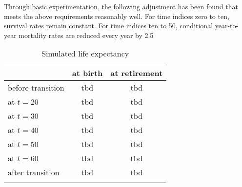 Through basic experimentation, the following adjustment has been found that meets the above requirements reasonably well. For time indices zero to ten, survival rates remain constant. For time indices ten to 50, conditional year-to-year mortality rates are reduced every year by 2.5%

\begin{table}[ht]
    \caption{Simulated life expectancy}
    \label{tab:life_expectancy}
    \centering
    \begin{tabular}{l c c}
        \hline \hline
                            &at birth   & at retirement \\
        \hline
        before transition   &tbd        &tbd \\
        at $t=20$           &tbd        &tbd \\
        at $t=30$           &tbd        &tbd \\
        at $t=40$           &tbd        &tbd \\
        at $t=50$           &tbd        &tbd \\
        at $t=60$           &tbd        &tbd \\
        after transition    &tbd        &tbd \\
        \hline \hline \\
    \end{tabular}
\end{table}

